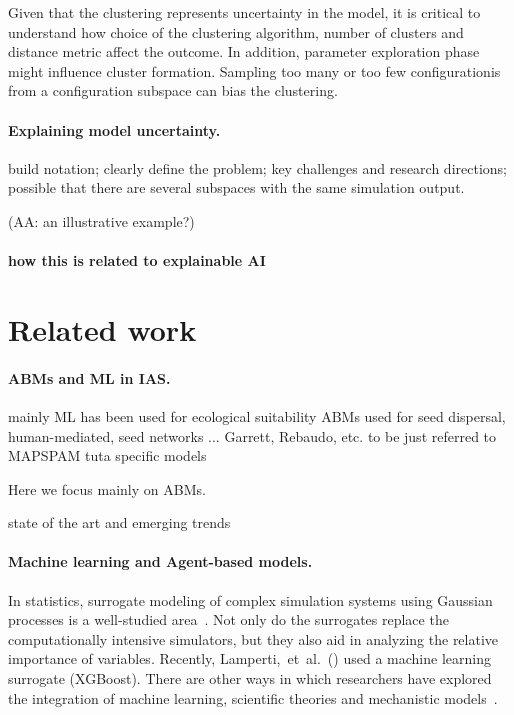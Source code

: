 \documentclass{article}
\newcommand{\aacomment}[1]{({\color{magenta}AA: #1})}
\begin{document}
Given that the clustering represents uncertainty in the model, it is
critical to understand how choice of the clustering algorithm, number of
clusters and distance metric affect the outcome. In addition, parameter
exploration phase might influence cluster formation. Sampling too many or
too few configurationis from a configuration subspace can bias the
clustering.

\paragraph{Explaining model uncertainty.}

build notation;
clearly define the problem;
key challenges and research directions; possible that there are several
subspaces with the same simulation output.

\aacomment{an illustrative example?}

\paragraph{how this is related to explainable AI}

\section{Related work}
\paragraph{ABMs and ML in IAS.}
mainly ML has been used for ecological suitability
ABMs used for seed dispersal, human-mediated, seed networks ...
Garrett, Rebaudo, etc. to be just referred to
MAPSPAM
tuta specific models

Here we focus mainly on ABMs.

state of the art and emerging trends

\paragraph{Machine learning and Agent-based models.} In statistics,
surrogate modeling of complex simulation systems using Gaussian processes
is a well-studied area~\cite{linkletter2006variable}. Not only do the
surrogates replace the computationally intensive simulators, but they also
aid in analyzing the relative importance of variables. Recently,
Lamperti,~et~al.~(\citeyear{lamperti2018agent}) used a machine learning
surrogate (XGBoost). There are other ways in which researchers have
explored the integration of machine learning, scientific theories and
mechanistic models~\cite{van2017deep,karpatne2017theory}.
\end{document}
